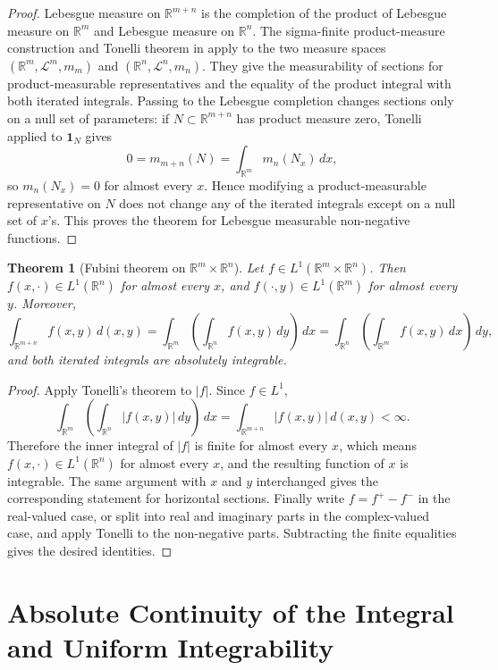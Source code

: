 \documentclass[11pt,openany]{book}
\numberwithin{equation}{chapter}
\theoremstyle{definition}
\theoremstyle{plain}
\newtheorem{theorem}[definition]{Theorem}
\theoremstyle{remark}
\newcommand{\R}{\mathbb{R}}
\newcommand{\1}{\mathbf{1}}
\newcommand{\dd}{\,d}
\newcommand{\abs}[1]{\left\lvert #1\right\rvert}
\begin{document}
\begin{proof}
Lebesgue measure on \(\R^{m+n}\) is the completion of the product of Lebesgue measure on \(\R^m\) and Lebesgue measure on \(\R^n\).  The sigma-finite product-measure construction and Tonelli theorem in  apply to the two measure spaces \((\R^m,\mathcal L^m,m_m)\) and \((\R^n,\mathcal L^n,m_n)\).  They give the measurability of sections for product-measurable representatives and the equality of the product integral with both iterated integrals.  Passing to the Lebesgue completion changes sections only on a null set of parameters: if \(N\subset\R^{m+n}\) has product measure zero, Tonelli applied to \(\1_N\) gives
\[
    0=m_{m+n}(N)=\int_{\R^m}m_n(N_x)\dd x,
\]
so \(m_n(N_x)=0\) for almost every \(x\).  Hence modifying a product-measurable representative on \(N\) does not change any of the iterated integrals except on a null set of \(x\)'s.  This proves the theorem for Lebesgue measurable non-negative functions.
\end{proof}

\begin{theorem}[Fubini theorem on \texorpdfstring{$\R^m\times\R^n$}{Rm x Rn}]
Let \(f\in L^1(\R^m\times\R^n)\).  Then \(f(x,\cdot)\in L^1(\R^n)\) for almost every \(x\), and \(f(\cdot,y)\in L^1(\R^m)\) for almost every \(y\). Moreover,
\[
    \int_{\R^{m+n}}f(x,y)\dd(x,y)
    =\int_{\R^m}\left(\int_{\R^n}f(x,y)\dd y\right)\dd x
    =\int_{\R^n}\left(\int_{\R^m}f(x,y)\dd x\right)\dd y,
\]
and both iterated integrals are absolutely integrable.
\end{theorem}

\begin{proof}
Apply Tonelli's theorem to \(\abs f\).  Since \(f\in L^1\),
\[
    \int_{\R^m}\left(\int_{\R^n}\abs{f(x,y)}\dd y\right)\dd x
    =\int_{\R^{m+n}}\abs{f(x,y)}\dd(x,y)<\infty.
\]
Therefore the inner integral of \(\abs f\) is finite for almost every \(x\), which means \(f(x,\cdot)\in L^1(\R^n)\) for almost every \(x\), and the resulting function of \(x\) is integrable.  The same argument with \(x\) and \(y\) interchanged gives the corresponding statement for horizontal sections.  Finally write \(f=f^+-f^-\) in the real-valued case, or split into real and imaginary parts in the complex-valued case, and apply Tonelli to the non-negative parts.  Subtracting the finite equalities gives the desired identities.
\end{proof}

\section{Absolute Continuity of the Integral and Uniform Integrability}
\end{document}
